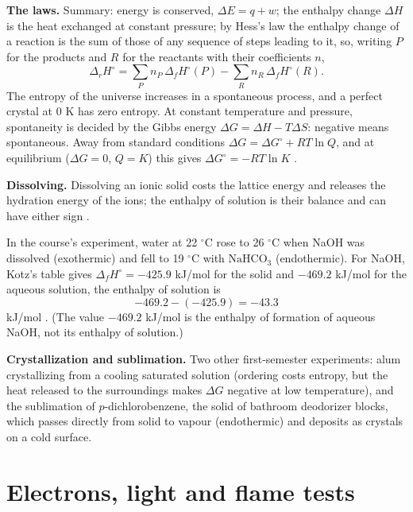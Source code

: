 \textbf{The laws.}
Summary: energy is
conserved, $\Delta E = q + w$; the enthalpy
change $\Delta H$ is the heat exchanged at
constant pressure; by Hess's law the enthalpy
change of a reaction is the sum of those of
any sequence of steps leading to it, so,
writing $P$ for the products and $R$ for the
reactants with their coefficients $n$,
$$
\Delta_r H^\circ = \sum_P n_P \, \Delta_f
H^\circ(P) - \sum_R n_R \, \Delta_f
H^\circ(R).
$$
The entropy of the universe increases in a
spontaneous process, and a perfect crystal at
0 K has zero entropy. At constant temperature
and pressure, spontaneity is decided by the
Gibbs energy $\Delta G = \Delta H - T\Delta
S$: negative means spontaneous. Away from
standard conditions $\Delta G = \Delta
G^\circ + RT \ln Q$, and at equilibrium
($\Delta G = 0$, $Q = K$) this gives $\Delta
G^\circ = -RT \ln K$ \cite[Chapters 5 and
19]{kotz2012chemistry}.

\textbf{Dissolving.}
Dissolving an ionic solid costs the lattice
energy and releases the hydration energy of
the ions; the enthalpy of solution is their
balance and can have either sign
\cite[Section 14.2]{kotz2012chemistry}.

\begin{example}
\label{example-chem-dissolution}
In the course's experiment, water at 22
$^\circ$C rose to 26 $^\circ$C when NaOH was
dissolved (exothermic) and fell to 19
$^\circ$C with $\mathrm{NaHCO_3}$
(endothermic). For NaOH, Kotz's table gives
$\Delta_f H^\circ = -425.9$ kJ/mol for the
solid and $-469.2$ kJ/mol for the aqueous
solution, the enthalpy of solution is
$$
-469.2 - (-425.9) = -43.3
$$
kJ/mol \cite[Section
14.2]{kotz2012chemistry}. (The value $-469.2$
kJ/mol is the enthalpy of formation of
aqueous NaOH, not its enthalpy of solution.)
\end{example}

\textbf{Crystallization and sublimation.}
Two other first-semester experiments: alum
crystallizing from a cooling saturated
solution (ordering costs entropy, but the
heat released to the surroundings makes
$\Delta G$ negative at low temperature), and
the sublimation of $p$-dichlorobenzene, the
solid of bathroom deodorizer blocks, which
passes directly from solid to vapour
(endothermic) and deposits as crystals on a
cold surface.

\section{Electrons, light and flame tests}
\label{section-chem-flame-tests}

